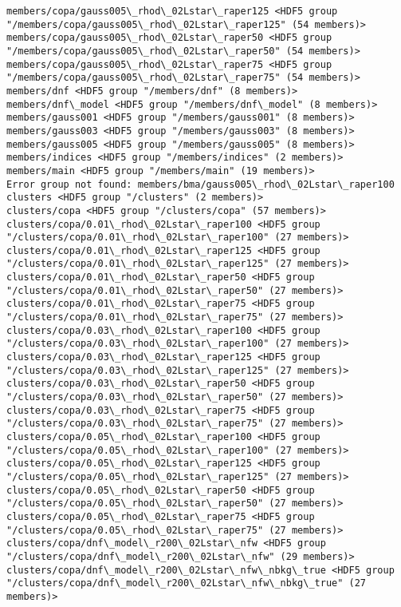 \documentclass[11pt]{article}
\begin{document}
\begin{Verbatim}[commandchars=\\\{\}]
members/copa/gauss005\_rhod\_02Lstar\_raper125 <HDF5 group "/members/copa/gauss005\_rhod\_02Lstar\_raper125" (54 members)>
members/copa/gauss005\_rhod\_02Lstar\_raper50 <HDF5 group "/members/copa/gauss005\_rhod\_02Lstar\_raper50" (54 members)>
members/copa/gauss005\_rhod\_02Lstar\_raper75 <HDF5 group "/members/copa/gauss005\_rhod\_02Lstar\_raper75" (54 members)>
members/dnf <HDF5 group "/members/dnf" (8 members)>
members/dnf\_model <HDF5 group "/members/dnf\_model" (8 members)>
members/gauss001 <HDF5 group "/members/gauss001" (8 members)>
members/gauss003 <HDF5 group "/members/gauss003" (8 members)>
members/gauss005 <HDF5 group "/members/gauss005" (8 members)>
members/indices <HDF5 group "/members/indices" (2 members)>
members/main <HDF5 group "/members/main" (19 members)>
Error group not found: members/bma/gauss005\_rhod\_02Lstar\_raper100
clusters <HDF5 group "/clusters" (2 members)>
clusters/copa <HDF5 group "/clusters/copa" (57 members)>
clusters/copa/0.01\_rhod\_02Lstar\_raper100 <HDF5 group "/clusters/copa/0.01\_rhod\_02Lstar\_raper100" (27 members)>
clusters/copa/0.01\_rhod\_02Lstar\_raper125 <HDF5 group "/clusters/copa/0.01\_rhod\_02Lstar\_raper125" (27 members)>
clusters/copa/0.01\_rhod\_02Lstar\_raper50 <HDF5 group "/clusters/copa/0.01\_rhod\_02Lstar\_raper50" (27 members)>
clusters/copa/0.01\_rhod\_02Lstar\_raper75 <HDF5 group "/clusters/copa/0.01\_rhod\_02Lstar\_raper75" (27 members)>
clusters/copa/0.03\_rhod\_02Lstar\_raper100 <HDF5 group "/clusters/copa/0.03\_rhod\_02Lstar\_raper100" (27 members)>
clusters/copa/0.03\_rhod\_02Lstar\_raper125 <HDF5 group "/clusters/copa/0.03\_rhod\_02Lstar\_raper125" (27 members)>
clusters/copa/0.03\_rhod\_02Lstar\_raper50 <HDF5 group "/clusters/copa/0.03\_rhod\_02Lstar\_raper50" (27 members)>
clusters/copa/0.03\_rhod\_02Lstar\_raper75 <HDF5 group "/clusters/copa/0.03\_rhod\_02Lstar\_raper75" (27 members)>
clusters/copa/0.05\_rhod\_02Lstar\_raper100 <HDF5 group "/clusters/copa/0.05\_rhod\_02Lstar\_raper100" (27 members)>
clusters/copa/0.05\_rhod\_02Lstar\_raper125 <HDF5 group "/clusters/copa/0.05\_rhod\_02Lstar\_raper125" (27 members)>
clusters/copa/0.05\_rhod\_02Lstar\_raper50 <HDF5 group "/clusters/copa/0.05\_rhod\_02Lstar\_raper50" (27 members)>
clusters/copa/0.05\_rhod\_02Lstar\_raper75 <HDF5 group "/clusters/copa/0.05\_rhod\_02Lstar\_raper75" (27 members)>
clusters/copa/dnf\_model\_r200\_02Lstar\_nfw <HDF5 group "/clusters/copa/dnf\_model\_r200\_02Lstar\_nfw" (29 members)>
clusters/copa/dnf\_model\_r200\_02Lstar\_nfw\_nbkg\_true <HDF5 group "/clusters/copa/dnf\_model\_r200\_02Lstar\_nfw\_nbkg\_true" (27 members)>

\end{Verbatim}
\end{document}
